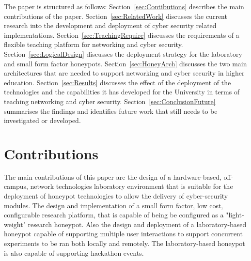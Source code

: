 \documentclass[10pt,journal]{IEEEtran}
\begin{document}
The paper is structured as follows: Section~\ref{sec:Contibutions} describes the main contributions of the paper. Section~\ref{sec:RelatedWork} discusses the current research into the development and deployment of cyber security related implementations. Section~\ref{sec:TeachingRequire} discusses the requirements of a flexible teaching platform for networking and cyber security. Section~\ref{sec:LogicalDesign} discusses the deployment strategy for the laboratory and small form factor honeypots. Section~\ref{sec:HoneyArch} discusses the two main architectures that are needed to support networking and cyber security in higher education. Section~\ref{sec:Results} discusses the effect of the deployment of the technologies and the capabilities it has developed for the University in terms of teaching networking and cyber security. Section~\ref{sec:ConclusionFuture} summarises the findings and identifies future work that still needs to be investigated or developed.

\section{Contributions}\label{sec:Contributions}
The main contributions of this paper are the design of a hardware-based, off-campus, network technologies laboratory environment that is suitable for the deployment of honeypot technologies to allow the delivery of cyber-security modules. The design and implementation of a small form factor, low cost, configurable research platform, that is capable of being be configured as a "light-weight" research honeypot. Also the design and deployment of a laboratory-based honeypot capable of supporting multiple user interactions to support concurrent experiments to be ran both locally and remotely. The laboratory-based honeypot is also capable of supporting hackathon events.  
\end{document}
